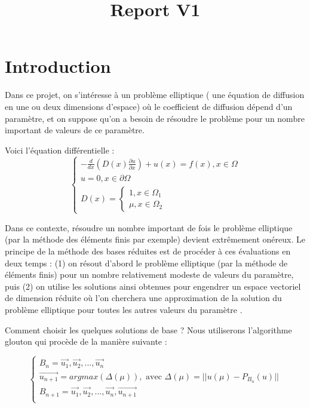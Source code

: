 \documentclass[12pt]{article}
\begin{document}
\title{Report V1}
\author{}
\maketitle



\tableofcontents

\section{Introduction}

Dans ce projet, on s’intéresse à un problème elliptique (
une équation de diffusion en une ou deux dimensions d’espace) où le coefficient de diffusion
dépend d’un paramètre, et on suppose qu’on a besoin de résoudre le problème pour un nombre
important de valeurs de ce paramètre.

Voici  l'équation différentielle :
$$
\begin{cases} 
- \frac{d }{dx}(D(x)\frac{\partial u}{\partial x}) + u(x) = f(x) , x \in \Omega \\
u = 0 , x \in \partial \Omega \\
D(x) = 
\begin{cases} 
1 , x \in \Omega _{1} \\
\mu , x \in \Omega _{2}
\end{cases}
\end{cases}
$$



Dans ce contexte, résoudre un nombre important de fois le problème elliptique (par la méthode des éléments finis par exemple) devient extrêmement onéreux. Le principe de la méthode des bases réduites est de procéder à ces
évaluations en deux temps : (1) on résout d’abord le problème elliptique
(par la méthode de éléments finis) pour un nombre relativement modeste
de valeurs du paramètre, puis (2) on utilise les solutions ainsi obtenues pour
engendrer un espace vectoriel de dimension réduite où l’on cherchera une
approximation de la solution du problème elliptique pour toutes les autres
valeurs du paramètre .

Comment choisir les quelques solutions de base ? Nous utiliserons l'algorithme glouton
qui procède de  la manière suivante :  

$$
\begin{cases} 
B_n = {\vec{u_1},\vec{u_2} , ... ,\vec{u_n}}  \\
\vec{u_{n+1}} =  argmax(\Delta(\mu) ) , \text{ avec  }  \Delta(\mu) = || u(\mu) - P_{B_n}(u)|| \\
B_{n+1} = {\vec{u_1},\vec{u_2} , ... ,\vec{u_n},\vec{u_{n+1}} } \\
\end{cases}
$$
\end{document}
